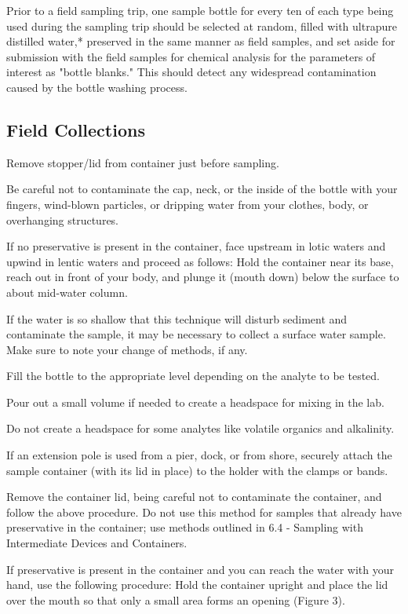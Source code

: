 \documentclass[12pt]{../SOP4_alpha}\usepackage[]{graphicx}\usepackage[]{xcolor}
\begin{document}
\NP Prior to a field sampling trip, one sample bottle for every ten of each type being used during the sampling trip should be selected at random, filled with ultrapure distilled water,* preserved in the same manner as field samples, and set aside for submission with the field samples for chemical analysis for the parameters of interest as "bottle blanks." This should detect any widespread contamination caused by the bottle washing process.

\subsection{Field Collections}

\NP Remove stopper/lid from container just before sampling. 

\NP Be careful not to contaminate the cap, neck, or the inside of the bottle with your fingers, wind-blown particles, or dripping water from your clothes, body, or overhanging structures.  

\NP If no preservative is present in the container, face upstream in lotic waters and upwind in lentic waters and proceed as follows:  Hold the container near its base, reach out in front of your body, and plunge it (mouth down) below the surface to about mid-water column. 

\NP If the water is so shallow that this technique will disturb sediment and contaminate the sample, it may be necessary to collect a surface water sample. Make sure to note your change of methods, if any.  

\NP Fill the bottle to the appropriate level depending on the analyte to be tested.  

\NP Pour out a small volume if needed to create a headspace for mixing in the lab. 

\NP Do not create a headspace for some analytes like volatile organics and alkalinity.  

\NP If an extension pole is used from a pier, dock, or from shore, securely attach the sample container (with its lid in place) to the holder with the clamps or bands. 

\NP Remove the container lid, being careful not to contaminate the container, and follow the above procedure. Do not use this method for samples that already have preservative in the container; use methods outlined in 6.4 - Sampling with Intermediate Devices and Containers.  

\NP If preservative is present in the container and you can reach the water with your hand, use the following procedure:  Hold the container upright and place the lid over the mouth so that only a small area forms an opening (Figure 3).
\end{document}
